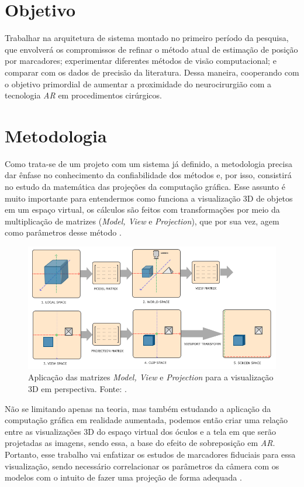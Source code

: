 \section{Objetivo}

Trabalhar na arquitetura de sistema montado no primeiro período da pesquisa, que envolverá os compromissos de refinar o método atual de estimação de posição por marcadores; experimentar diferentes métodos de visão computacional; e comparar com os dados de precisão da literatura. Dessa maneira, cooperando com o objetivo primordial de aumentar a proximidade do neurocirurgião com a tecnologia \textit{AR} em procedimentos cirúrgicos.  

\section{Metodologia}

Como trata-se de um projeto com um sistema já definido, a metodologia precisa dar ênfase no conhecimento da confiabilidade dos métodos e, por isso, consistirá no estudo da matemática das projeções da computação gráfica. Esse assunto é muito importante para entendermos como funciona a visualização 3D de objetos em um espaço virtual, os cálculos são feitos com transformações por meio da multiplicação de matrizes (\textit{Model, View} e \textit{Projection}), que por sua vez, agem como parâmetros desse método \cite{learnopengl-coord-sys}.

\begin{figure}[ht]
   \centering
   \includegraphics[width=.65\linewidth]{figuras/coordinate_systems.png}
   \caption{Aplicação das matrizes \textit{Model, View} e \textit{Projection} para a visualização 3D em perspectiva. Fonte: \cite{learnopengl-coord-sys}.}
   \label{fig:coord-sys}
\end{figure}

Não se limitando apenas na teoria, mas também estudando a aplicação da computação gráfica em realidade aumentada, podemos então criar uma relação entre as visualizações 3D do espaço virtual dos óculos e a tela em que serão projetadas as imagens, sendo essa, a base do efeito de sobreposição em \textit{AR}. Portanto, esse trabalho vai enfatizar os estudos de marcadores fiduciais para essa visualização, sendo necessário correlacionar os parâmetros da câmera com os modelos com o intuito de fazer uma projeção de forma adequada \cite{learningOpenGL}.

